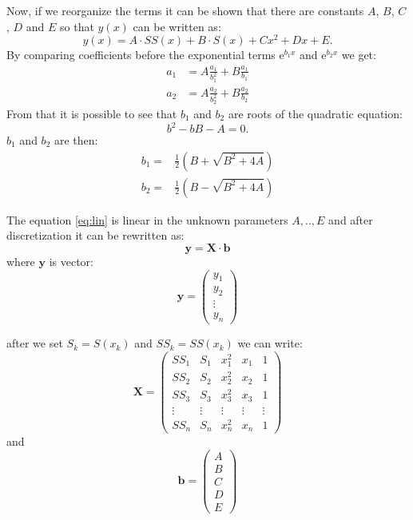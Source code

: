 Now, if we reorganize the terms it can be shown that there are constants $A$, $B$, $C$, $D$ and $E$ so that $y(x)$ can be written as:
\begin{equation}
	\label{eq:lin}
	y(x) = A\cdot SS(x)+B\cdot S(x) + C x^2 + Dx + E.
\end{equation}
By comparing coefficients before the exponential terms $\mathrm{e}^{b_1 x}$ and $\mathrm{e}^{b_2 x}$ we get:
\begin{align}
	a_1 & = A\frac{a_1}{b_1^2} + B\frac{a_1}{b_1}  \\
	a_2 & = A\frac{a_2}{b_2^2} + B\frac{a_2}{b_2}
\end{align}
From that it is possible to see that $b_1$ and $b_2$ are roots of the quadratic equation:
\begin{equation}
	b^2 - bB - A = 0.
\end{equation}
$b_1$ and $b_2$ are then:
\begin{align}
	\label{eq:roots}
	b_1 = & \frac{1}{2}\left(B + \sqrt{B^2 + 4A}\right) \\
	b_2 = & \frac{1}{2}\left(B - \sqrt{B^2 + 4A}\right)
\end{align}

The equation \ref{eq:lin} is linear in the unknown parameters $A,..,E$ and after discretization it can be rewritten as: 
\begin{equation}
	\label{eq:lin-vec}
	\boldsymbol{y}=\boldsymbol{X}\cdot \boldsymbol{b}
\end{equation}
where $\boldsymbol{y}$ is vector:
\begin{equation}
	\boldsymbol{y} =
	\begin{pmatrix}
		y_1 \\
		y_2 \\
		\vdots \\
		y_n  
	\end{pmatrix}
\end{equation}

after we set $S_k=S(x_k)$ and $SS_k=SS(x_k)$ we can write:
\begin{equation}
	\boldsymbol{X} =
	\begin{pmatrix}
		SS_1 & S_1 & x_1^2 & x_1 & 1 \\
		SS_2 & S_2 & x_2^2 & x_2 & 1 \\
		SS_3 & S_3 & x_3^2 & x_3 & 1 \\
		\vdots & \vdots & \vdots & \vdots & \vdots \\
		SS_n & S_n & x_n^2 & x_n & 1  
	\end{pmatrix}
\end{equation}
and 
\begin{equation}
	\boldsymbol{b} =
	\begin{pmatrix}
		A \\
		B \\
		C \\
		D \\
		E  
	\end{pmatrix}
\end{equation}

